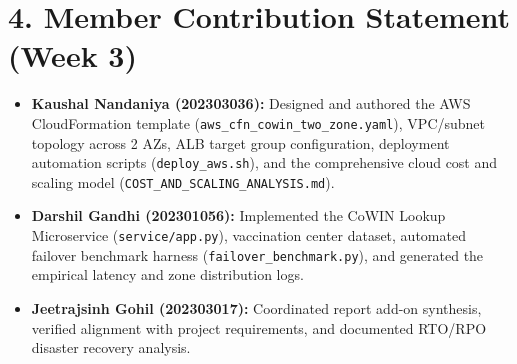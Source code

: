 \documentclass[11pt,a4paper]{article}
\newcommand{\sectionline}[1]{\section*{\color{navy}#1}}
\begin{document}
\sectionline{4. Member Contribution Statement (Week 3)}
\begin{itemize}
    \item \textbf{Kaushal Nandaniya (202303036):} Designed and authored the AWS CloudFormation template (\texttt{aws\_cfn\_cowin\_two\_zone.yaml}), VPC/subnet topology across 2 AZs, ALB target group configuration, deployment automation scripts (\texttt{deploy\_aws.sh}), and the comprehensive cloud cost and scaling model (\texttt{COST\_AND\_SCALING\_ANALYSIS.md}).
    \item \textbf{Darshil Gandhi (202301056):} Implemented the CoWIN Lookup Microservice (\texttt{service/app.py}), vaccination center dataset, automated failover benchmark harness (\texttt{failover\_benchmark.py}), and generated the empirical latency and zone distribution logs.
    \item \textbf{Jeetrajsinh Gohil (202303017):} Coordinated report add-on synthesis, verified alignment with project requirements, and documented RTO/RPO disaster recovery analysis.
\end{itemize}
\end{document}
